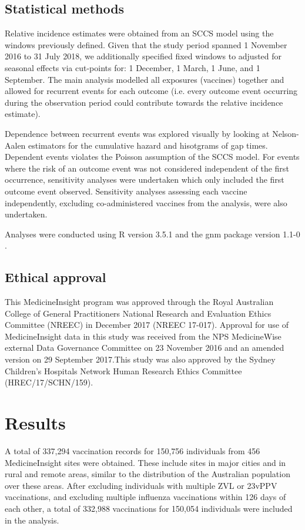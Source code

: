 \documentclass[review, endfloat]{elsarticle}
\begin{document}
\subsection{Statistical methods}

Relative incidence estimates were obtained from an SCCS model \citep{farrington2018} using the windows previously defined. Given that the study period spanned 1 November 2016 to 31 July 2018, we additionally specified fixed windows to adjusted for seasonal effects via cut-points for: 1 December, 1 March, 1 June, and 1 September. The main analysis modelled all exposures (vaccines) together and allowed for recurrent events for each outcome (i.e. every outcome event occurring during the observation period could contribute towards the relative incidence estimate). 

Dependence between recurrent events was explored visually by looking at Nelson-Aalen estimators for the cumulative hazard and hisotgrams of gap times. Dependent events violates the Poisson assumption of the SCCS model. For events where the risk of an outcome event was not considered independent of the first occurrence, sensitivity analyses were undertaken which only included the first outcome event observed.  Sensitivity analyses assessing each vaccine independently, excluding co-administered vaccines from the analysis, were also undertaken. 

Analyses were conducted using R version 3.5.1 \citep{rmanual} and the gnm package version 1.1-0 \citep{rgnm}.

\subsection{Ethical approval}

This MedicineInsight program was approved through the Royal Australian College of General Practitioners National Research and Evaluation Ethics Committee (NREEC) in December 2017 (NREEC 17-017). Approval for use of MedicineInsight data in this study was received from the NPS MedicineWise external Data Governance Committee on 23 November 2016 and an amended version on 29 September 2017.This study was also approved by the Sydney Children’s Hospitals Network Human Research Ethics Committee (HREC/17/SCHN/159). 

\section{Results}

A total of 337,294 vaccination records for 150,756 individuals from 456 MedicineInsight sites were obtained. These include sites in major cities and in rural and remote areas, similar to the distribution of the Australian population over these areas. After excluding individuals with multiple ZVL or 23vPPV vaccinations, and excluding multiple influenza vaccinations within 126 days of each other, a total of 332,988 vaccinations for 150,054 individuals were included in the analysis. 
\end{document}
